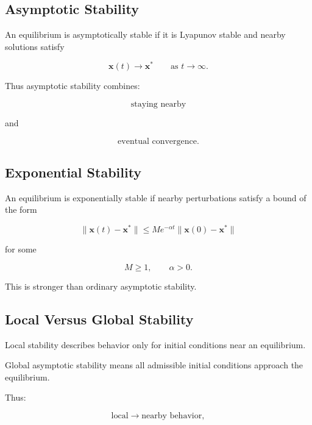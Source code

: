 \subsection{Asymptotic Stability}
\label{subsec:asymptotic-stability}

An equilibrium is asymptotically stable if it is Lyapunov stable and
nearby solutions satisfy

\[
\boxed{
\mathbf{x}(t)
\to
\mathbf{x}^*
\qquad
\text{as }
t\to\infty.
}
\]

Thus asymptotic stability combines:

\[
\boxed{
\text{staying nearby}
}
\]

and

\[
\boxed{
\text{eventual convergence}.
}
\]

\subsection{Exponential Stability}
\label{subsec:exponential-stability}

An equilibrium is exponentially stable if nearby perturbations satisfy a
bound of the form

\[
\boxed{
\|
\mathbf{x}(t)-\mathbf{x}^*
\|
\leq
M
e^{-\alpha t}
\|
\mathbf{x}(0)-\mathbf{x}^*
\|
}
\]

for some

\[
M\geq1,
\qquad
\alpha>0.
\]

This is stronger than ordinary asymptotic stability.

\subsection{Local Versus Global Stability}
\label{subsec:local-global-stability}

Local stability describes behavior only for initial conditions near an
equilibrium.

Global asymptotic stability means all admissible initial conditions
approach the equilibrium.

Thus:

\[
\boxed{
\text{local}
\rightarrow
\text{nearby behavior},
}
\]


